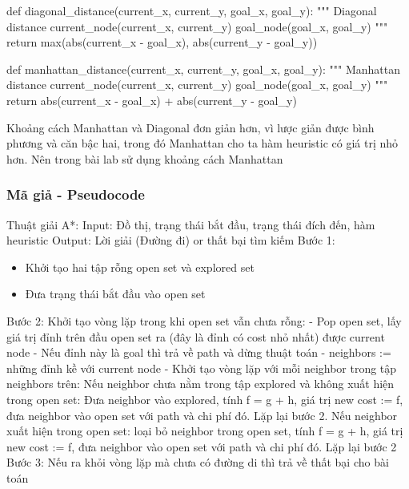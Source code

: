 \documentclass{article}
\newcommand\tab[1][1cm]{\hspace*{#1}}
\begin{document}
\begin{python}
def diagonal_distance(current_x, current_y, goal_x, goal_y):
    """
    Diagonal distance
    current_node(current_x, current_y)
    goal_node(goal_x, goal_y)
    """
    return max(abs(current_x - goal_x),  abs(current_y - goal_y))
\end{python}

\begin{python}
def manhattan_distance(current_x, current_y, goal_x, goal_y):
    """
    Manhattan distance
    current_node(current_x, current_y)
    goal_node(goal_x, goal_y)
    """
    return abs(current_x - goal_x) + abs(current_y - goal_y)
\end{python}
Khoảng cách Manhattan và Diagonal đơn giản hơn, vì lược giản được bình phương và căn bậc hai, trong đó Manhattan cho ta hàm heuristic có giá trị nhỏ hơn. Nên trong bài lab sử dụng khoảng cách Manhattan


\subsubsection{Mã giả - Pseudocode}
Thuật giải A*:\newline
Input: Đồ thị, trạng thái bắt đầu, trạng thái đích đến, hàm heuristic\newline
Output: Lời giải (Đường đi) or thất bại tìm kiếm\newline
Bước 1:
\begin{itemize}
    \item Khởi tạo hai tập rỗng open set và explored set
    \item Đưa trạng thái bắt đầu vào open set
\end{itemize}
Bước 2: \newline
Khởi tạo vòng lặp trong khi open set vẫn chưa rỗng:\newline
- Pop open set, lấy giá trị đỉnh trên đầu open set ra (đây là đỉnh có cost nhỏ nhất) được current node\newline
- Nếu đỉnh này là goal thì trả về path và dừng thuật toán\newline
- neighbors := những đỉnh kề với  current node\newline
- Khởi tạo vòng lặp với mỗi neighbor trong tập neighbors trên:\newline
\tab Nếu neighbor chưa nằm trong tập explored và không xuất hiện trong open set: Đưa neighbor vào explored, tính f = g + h, giá trị new cost := f, đưa neighbor vào open set với path và chi phí đó. Lặp lại bước 2.\newline
\tab Nếu neighbor xuất hiện trong open set: loại bỏ neighbor trong open set, tính f = g + h, giá trị new cost := f, đưa neighbor vào open set với path và chi phí đó. Lặp lại bước 2\newline
Bước 3: Nếu ra khỏi vòng lặp mà chưa có đường di thì trả về thất bại cho bài toán
\end{document}
